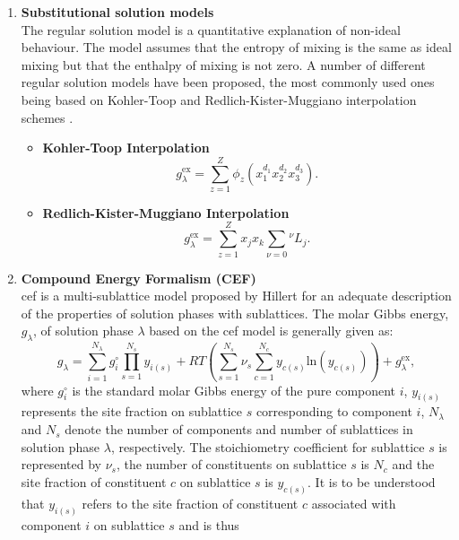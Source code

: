 	\begin{enumerate}
	\item \textbf{Substitutional solution models}\\
	The regular solution model is a quantitative explanation of non-ideal behaviour. The model assumes that the entropy of mixing is the same as ideal mixing but that the enthalpy of mixing is not zero. A number of different regular solution models have been proposed, the most commonly used ones being based on Kohler-Toop and Redlich-Kister-Muggiano interpolation schemes \cite{Lukas07}.
		\begin{itemize}
			\item \textbf{Kohler-Toop Interpolation}
			\begin{equation}
				g_{\lambda}^\text{ex} = \sum_{z=1}^Z \phi_z (x_1^{d_1} x_2^{d_2} x_3^{d_3} ).
			\end{equation}
			\item \textbf{Redlich-Kister-Muggiano Interpolation}
			\begin{equation}
				g_{\lambda}^\text{ex} = \sum_{z=1}^Z x_j x_k \sum_{\nu = 0} {^\nu}L_{j}.
			\end{equation}
			\end{itemize}
	\item \textbf{Compound Energy Formalism (CEF)} \\
	\gls{cef} is a multi-sublattice model proposed by Hillert \cite{Hillert01} for an adequate description of the properties of solution phases with sublattices. The molar Gibbs energy, $g_{\lambda}$, of solution phase $\lambda$ based on the \gls{cef} model is generally given as:
	\begin{equation}\label{eq:g_lambda}
	g_{\lambda} = \sum_{i=1}^{N_{\lambda}} g_{i}^{\circ} \prod _{s=1}^{N_s} y_{i(s)} + RT\left( \sum_{s=1}^{N_s} \nu_s \sum_{c=1}^{N_c}   y_{c(s)} \mathrm{ln} (y_{c(s)}) \right) + g_{\lambda}^\text{ex},
	\end{equation}
	where $g_{i}^{\circ}$ is the standard molar Gibbs energy of the pure component $i$,
$y_{i(s)}$ represents the site fraction on sublattice $s$ corresponding to component $i$, $N_{\lambda}$ and
$N_s$ denote the number of components and number of sublattices in solution phase $\lambda$, respectively.
The stoichiometry coefficient for sublattice $s$ is represented by $\nu_s$, the number of constituents on sublattice $s$ is $N_c$
and the site fraction of constituent $c$ on sublattice $s$ is $y_{c(s)}$.  It is to be understood that $y_{i(s)}$
refers to the site fraction of  constituent $c$ associated with component $i$ on sublattice $s$ and is thus

\end{enumerate}
